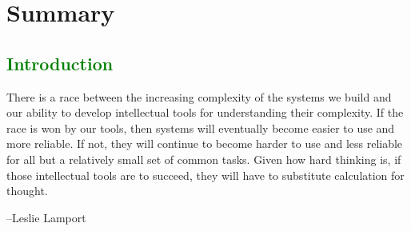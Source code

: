 \documentclass[12pt,initial,twoside,maitrise]{dms}
\newcommand{\welldone}[1]{\textcolor{green}{#1}}
\numberwithin{equation}{section}
\numberwithin{table}{chapter}
\numberwithin{figure}{chapter}
\begin{document}

\chapter*{Summary}


\anglais
\cleardoublepage
{}  %
\tableofcontents
\cleardoublepage
{}  %
\listoftables
\cleardoublepage
{}
\listoffigures

\NoChapterPageNumber
\cleardoublepage
{}

\welldone{\chapter{Introduction}\label{ch:introduction}}

\setlength{\epigraphwidth}{0.85\textwidth}
\epigraph{There is a race between the increasing complexity of the systems we build and our ability to develop intellectual tools for understanding their complexity. If the race is won by our tools, then systems will eventually become easier to use and more reliable. If not, they will continue to become harder to use and less reliable for all but a relatively small set of common tasks. Given how hard thinking is, if those intellectual tools are to succeed, they will have to substitute calculation for thought.}{\begin{flushright}--Leslie Lamport\end{flushright}}
\end{document}
